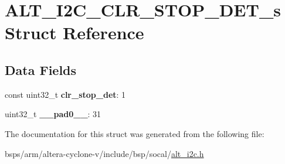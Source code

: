 \hypertarget{structALT__I2C__CLR__STOP__DET__s}{}\section{A\+L\+T\+\_\+\+I2\+C\+\_\+\+C\+L\+R\+\_\+\+S\+T\+O\+P\+\_\+\+D\+E\+T\+\_\+s Struct Reference}
\label{structALT__I2C__CLR__STOP__DET__s}
\subsection*{Data Fields}
\begin{DoxyCompactItemize}
\item 
\mbox{\label{structALT__I2C__CLR__STOP__DET__s_a317b124e47fa5183d4e9c4efcf351cd4}} 
const uint32\+\_\+t {\bfseries clr\+\_\+stop\+\_\+det}\+: 1
\item 
\mbox{\label{structALT__I2C__CLR__STOP__DET__s_aa8a572d6e71e5d84bfbdb9ec39f7e600}} 
uint32\+\_\+t {\bfseries \+\_\+\+\_\+pad0\+\_\+\+\_\+}\+: 31
\end{DoxyCompactItemize}


The documentation for this struct was generated from the following file\+:\begin{DoxyCompactItemize}
\item 
bsps/arm/altera-\/cyclone-\/v/include/bsp/socal/\mbox{\hyperlink{socal_2alt__i2c_8h}{alt\+\_\+i2c.\+h}}\end{DoxyCompactItemize}
